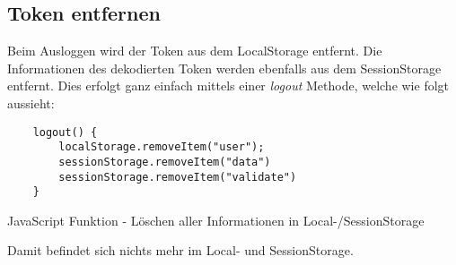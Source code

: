 \subsection{Token entfernen}

Beim Ausloggen wird der Token aus dem LocalStorage entfernt. Die Informationen des dekodierten Token 
werden ebenfalls aus dem SessionStorage entfernt. Dies erfolgt ganz einfach mittels einer \textit{logout}
Methode, welche wie folgt aussieht:

\begin{code}[htp]
\begin{lstlisting}
    logout() {
        localStorage.removeItem("user");
        sessionStorage.removeItem("data")
        sessionStorage.removeItem("validate")
    }    
\end{lstlisting}
\caption{JavaScript Funktion - Löschen aller Informationen in Local-/SessionStorage}
\end{code}
Damit befindet sich nichts mehr im Local- und SessionStorage.
